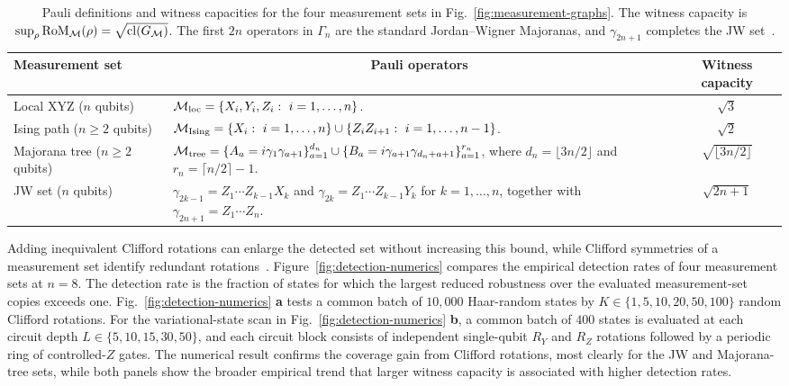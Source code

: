 \documentclass[10pt,aps,pra,twocolumn,floatfix,nofootinbib,superscriptaddress,longbibliography]{revtex4-2}
\newcommand{\Mcal}{\mathcal M}
\newcommand{\RoM}{\mathrm{RoM}}
\begin{document}
{		\begin{table}[!t]
			\caption{
				Pauli definitions and witness capacities for the four measurement sets in Fig.~\ref{fig:measurement-graphs}.
				The witness capacity is $\sup_\rho\RoM_\Mcal(\rho)=\sqrt{\clnum(G_\Mcal)}$.
				The first $2n$ operators in $\Gamma_n$ are the standard Jordan--Wigner Majoranas, and $\gamma_{2n+1}$ completes the JW set~\cite{zurel2025simulation}.
			}
			\label{tab:measurement-sets}
			\small
			\setlength{\tabcolsep}{4pt}
			\begin{tabular}{@{}llc@{}}
				\toprule
				Measurement set & \multicolumn{1}{c}{Pauli operators} & Witness capacity \\
				\midrule
				Local XYZ ($n$ qubits) & \parbox[t]{0.56\textwidth}{$\Mcal_{\rm loc}=\{X_i,Y_i,Z_i:\ i=1,\ldots,n\}$.} & $\sqrt3$ \\[2pt]
				Ising path ($n\ge2$ qubits) & \parbox[t]{0.56\textwidth}{$\Mcal_{\rm Ising}=\{X_i:\ i=1,\ldots,n\}\cup\{Z_iZ_{i+1}:\ i=1,\ldots,n-1\}$.} & $\sqrt2$ \\[2pt]
				Majorana tree ($n\ge2$ qubits) & \parbox[t]{0.56\textwidth}{$\Mcal_{\rm tree}=\{A_a=i\gamma_1\gamma_{a+1}\}_{a=1}^{d_n}\cup\{B_a=i\gamma_{a+1}\gamma_{d_n+a+1}\}_{a=1}^{r_n}$, where $d_n=\lfloor3n/2\rfloor$ and $r_n=\lceil n/2\rceil-1$.} & $\sqrt{\lfloor3n/2\rfloor}$ \\[2pt]
				JW set ($n$ qubits) & \parbox[t]{0.56\textwidth}{$\gamma_{2k-1}=Z_1\cdots Z_{k-1}X_k$ and $\gamma_{2k}=Z_1\cdots Z_{k-1}Y_k$ for $k=1,\ldots,n$, together with $\gamma_{2n+1}=Z_1\cdots Z_n$.} & $\sqrt{2n+1}$ \\
				\bottomrule
			\end{tabular}
		\end{table}
	}
	
	
	\mainMeasurementDefinitions
	Adding inequivalent Clifford rotations can enlarge the detected set without increasing this bound, while Clifford symmetries of a measurement set identify redundant rotations~\cite{nation2026clifford}. Figure~\ref{fig:detection-numerics} compares the empirical detection rates of four measurement sets at $n=8$.
	The detection rate is the fraction of states for which the largest reduced robustness over the evaluated measurement-set copies exceeds one.
	Fig.~\ref{fig:detection-numerics} \textbf{a} tests a common batch of $10{,}000$ Haar-random states by $K\in\{1,5,10,20,50,100\}$ random Clifford rotations.
	For the variational-state scan in Fig.~\ref{fig:detection-numerics} \textbf{b}, a common batch of $400$ states is evaluated at each circuit depth $L\in\{5,10,15,30,50\}$, and each circuit block consists of independent single-qubit $R_Y$ and $R_Z$ rotations followed by a periodic ring of controlled-$Z$ gates.
	The numerical result confirms the coverage gain from Clifford rotations, most clearly for the JW and Majorana-tree sets, while both panels show the broader empirical trend that larger witness capacity is associated with higher detection rates.
	
\end{document}
